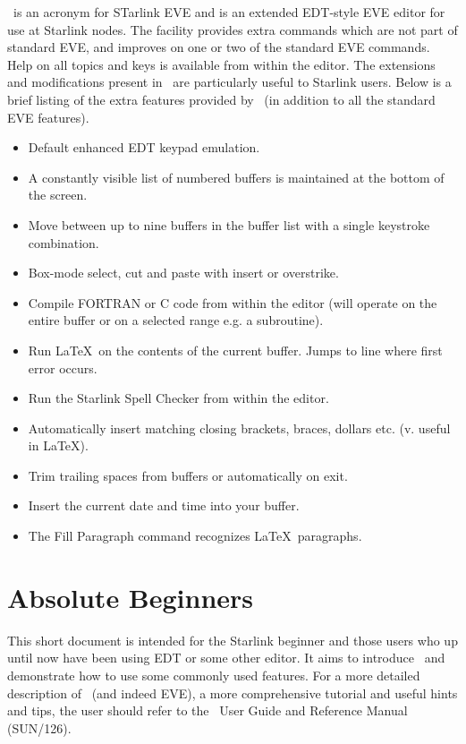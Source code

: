 \STEve\ is an acronym for STarlink EVE and is an extended EDT-style EVE 
editor for use at Starlink nodes. The facility provides extra commands which
are not part of standard EVE, and improves on one or two of the standard EVE
commands. Help on all topics and keys is available from within the editor. The
extensions and modifications present in \STEve\ are particularly useful to
Starlink users. Below is a brief listing of the extra features provided by
\STEve\ (in addition to all the standard EVE features). 

\begin{itemize}

\item Default enhanced EDT keypad emulation.
\item A constantly visible list of numbered buffers is maintained at the
       bottom of the screen.
\item Move between up to nine buffers in the buffer list with a single
      keystroke combination.
\item Box-mode select, cut and paste with insert or overstrike.
\item Compile FORTRAN or C code from within the editor (will operate on
      the entire buffer or on a selected range e.g. a subroutine).
\item Run \LaTeX\ on the contents of the current buffer. Jumps to
      line where first error occurs. 
\item Run the Starlink Spell Checker from within the editor.
\item Automatically insert matching closing brackets, braces, dollars etc.
      (v. useful in \LaTeX).
\item Trim trailing spaces from buffers or automatically on exit.
\item Insert the current date and time into your buffer.
\item The Fill Paragraph command recognizes \LaTeX\ paragraphs.
\end{itemize}

\section*{Absolute Beginners}

This short document is intended for the Starlink beginner and those users who
up until now have been using EDT or some other editor. It aims to introduce
\STEve\ and demonstrate how to use some commonly used features. For a more
detailed description of \STEve\ (and indeed EVE), a more comprehensive tutorial
and useful hints and tips, the user should refer to the \STEve\ User Guide and
Reference Manual (SUN/126).

